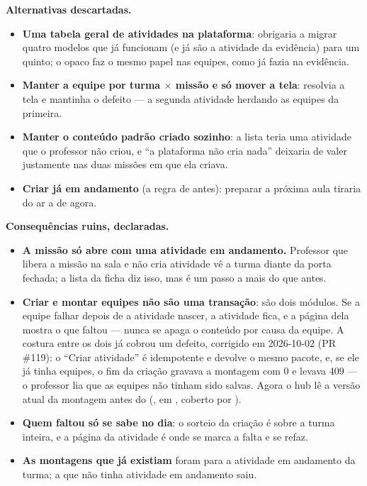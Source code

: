 \textbf{Alternativas descartadas.}

\begin{itemize}
  \item \textbf{Uma tabela geral de atividades na plataforma}: obrigaria a
    migrar quatro modelos que já funcionam (e já são a atividade da evidência)
    para um quinto; o  opaco faz o mesmo papel nas equipes, como
    já fazia na evidência.
  \item \textbf{Manter a equipe por turma $\times$ missão e só mover a tela}:
    resolvia a tela e mantinha o defeito --- a segunda atividade herdando as
    equipes da primeira.
  \item \textbf{Manter o conteúdo padrão criado sozinho}: a lista teria uma
    atividade que o professor não criou, e \enquote{a plataforma não cria nada}
    deixaria de valer justamente nas duas missões em que ela criava.
  \item \textbf{Criar já em andamento} (a regra de antes): preparar a próxima
    aula tiraria do ar a de agora.
\end{itemize}

\textbf{Consequências ruins, declaradas.}

\begin{itemize}
  \item \textbf{A missão só abre com uma atividade em andamento.} Professor que
    libera a missão na sala e não cria atividade vê a turma diante da porta
    fechada; a lista da ficha diz isso, mas é um passo a mais do que antes.
  \item \textbf{Criar e montar equipes não são uma transação}: são dois
    módulos. Se a equipe falhar depois de a atividade nascer, a atividade fica,
    e a página dela mostra o que faltou --- nunca se apaga o conteúdo por causa
    da equipe. A costura entre os dois já cobrou um defeito, corrigido em
    2026-10-02 (PR \#119): o \enquote{Criar atividade} é idempotente e devolve
    o mesmo pacote, e, se ele já tinha equipes, o fim da criação gravava a
    montagem com  0 e levava 409 --- o professor lia que as equipes
    não tinham sido salvas. Agora o hub lê a versão atual da montagem antes do
     (, em
    , coberto por
    ).
  \item \textbf{Quem faltou só se sabe no dia}: o sorteio da criação é sobre a
    turma inteira, e a página da atividade é onde se marca a falta e se refaz.
  \item \textbf{As montagens que já existiam} foram para a atividade em
    andamento da turma; a que não tinha atividade em andamento saiu.
\end{itemize}

